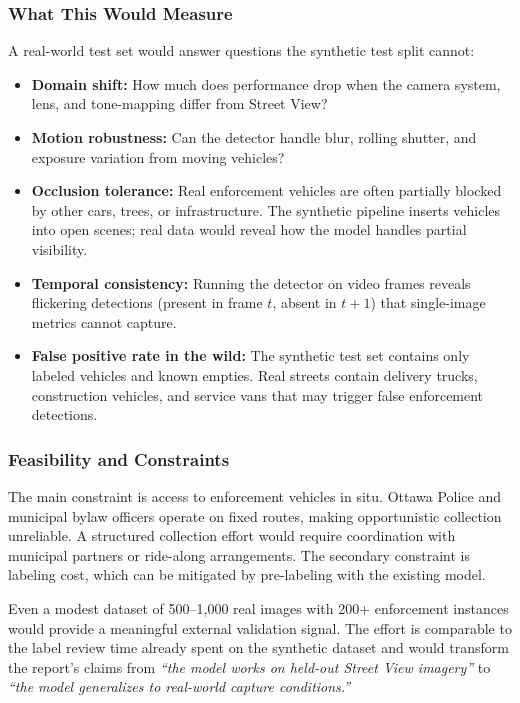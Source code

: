 \documentclass[12pt,a4paper]{article}
\begin{document}
\subsubsection{What This Would Measure}

A real-world test set would answer questions the synthetic test split cannot:

\begin{itemize}
	\item \textbf{Domain shift:} How much does performance drop when the camera system, lens, and tone-mapping differ from Street View?
	\item \textbf{Motion robustness:} Can the detector handle blur, rolling shutter, and exposure variation from moving vehicles?
	\item \textbf{Occlusion tolerance:} Real enforcement vehicles are often partially blocked by other cars, trees, or infrastructure. The synthetic pipeline inserts vehicles into open scenes; real data would reveal how the model handles partial visibility.
	\item \textbf{Temporal consistency:} Running the detector on video frames reveals flickering detections (present in frame $t$, absent in $t+1$) that single-image metrics cannot capture.
	\item \textbf{False positive rate in the wild:} The synthetic test set contains only labeled vehicles and known empties. Real streets contain delivery trucks, construction vehicles, and service vans that may trigger false enforcement detections.
\end{itemize}

\subsubsection{Feasibility and Constraints}

The main constraint is access to enforcement vehicles in situ. Ottawa Police and municipal bylaw officers operate on fixed routes, making opportunistic collection unreliable. A structured collection effort would require coordination with municipal partners or ride-along arrangements. The secondary constraint is labeling cost, which can be mitigated by pre-labeling with the existing model.

Even a modest dataset of 500--1,000 real images with 200+ enforcement instances would provide a meaningful external validation signal. The effort is comparable to the label review time already spent on the synthetic dataset and would transform the report's claims from \emph{``the model works on held-out Street View imagery''} to \emph{``the model generalizes to real-world capture conditions.''}
\end{document}

